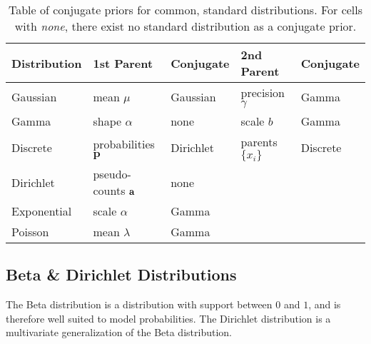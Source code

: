 \begin{table}[h]
\begin{tabular}{lllll}
\hline
\multicolumn{1}{|l|}{\textbf{Distribution}} & \multicolumn{1}{l|}{\textbf{1st Parent}}        & \multicolumn{1}{l|}{\textbf{Conjugate}} & \multicolumn{1}{l|}{\textbf{2nd Parent}} & \multicolumn{1}{l|}{\textbf{Conjugate}} \\ \hline
\multicolumn{1}{|l|}{Gaussian}              & \multicolumn{1}{l|}{mean $\mu$}                 & \multicolumn{1}{l|}{Gaussian}           & \multicolumn{1}{l|}{precision $\gamma$}  & \multicolumn{1}{l|}{Gamma}              \\ \hline
\multicolumn{1}{|l|}{Gamma}                 & \multicolumn{1}{l|}{shape $\alpha$}             & \multicolumn{1}{l|}{none}               & \multicolumn{1}{l|}{scale $b$}           & \multicolumn{1}{l|}{Gamma}              \\ \hline
\multicolumn{1}{|l|}{Discrete}              & \multicolumn{1}{l|}{probabilities $\mathbf{p}$} & \multicolumn{1}{l|}{Dirichlet}          & \multicolumn{1}{l|}{parents $\{x_i\}$}   & \multicolumn{1}{l|}{Discrete}           \\ \hline
\multicolumn{1}{|l|}{Dirichlet}             & \multicolumn{1}{l|}{pseudo-counts $\bf a$}      & \multicolumn{1}{l|}{none}               & \multicolumn{1}{l|}{}                    & \multicolumn{1}{l|}{}                   \\ \hline
\multicolumn{1}{|l|}{Exponential}           & \multicolumn{1}{l|}{scale $\alpha$}             & \multicolumn{1}{l|}{Gamma}              & \multicolumn{1}{l|}{}                    & \multicolumn{1}{l|}{}                   \\ \hline
\multicolumn{1}{|l|}{Poisson}               & \multicolumn{1}{l|}{mean $\lambda$}             & \multicolumn{1}{l|}{Gamma}              & \multicolumn{1}{l|}{}                    & \multicolumn{1}{l|}{}                   \\ \hline
\end{tabular}
\caption{Table of conjugate priors for common, standard distributions. For cells with \textit{none}, there exist no standard distribution as a conjugate prior. \cite[p.~676]{winnbishop}}
\label{table:conjugate_priors}
\end{table}


\subsection{Beta \& Dirichlet Distributions}
The Beta distribution is a distribution with support between $0$ and $1$, and is therefore well suited to model probabilities. The Dirichlet distribution is a multivariate generalization of the Beta distribution. 

